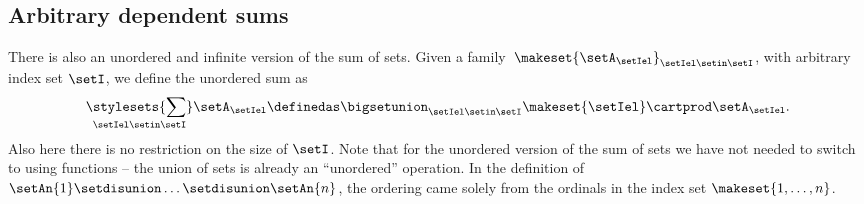 \subsection{Arbitrary dependent sums}

There is also an unordered and infinite version of the sum of sets.
Given a family~$\makeset{ \setA_{\setIel} }_{\setIel \setin\setI}$, with arbitrary index set $\setI$, we define the unordered sum as
\begin{equation}
    \underset{\setIel \setin\setI}{\stylesets{\sum}} \setA_{\setIel} \definedas \bigsetunion_{\setIel \setin\setI} \makeset{ \setIel } \cartprod \setA_{\setIel}.
\end{equation}
Also here there is no restriction on the size of $\setI$.
Note that for the unordered version of the sum of sets we have not needed to switch to using functions -- the union of sets is already an ``unordered'' operation.
In the definition of $\setAn{1} \setdisunion \dots \setdisunion \setAn{n}$, the ordering came solely from the ordinals in the index set $\makeset{1, \dots, n}$.





